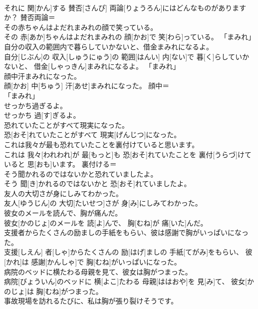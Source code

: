 \documentclass[8pt]{extreport}
\begin{document}
\begin{CJK}{UTF8}{min}
\\	それに 関[かん]する 賛否[さんぴ] 両論[りょうろん]にはどんなものがありますか？	賛否両論＝ 
\\	その赤ちゃんはよだれまみれの顔で笑っている。	
\\	その 赤[あか]ちゃんはよだれまみれの 顔[かお]で 笑[わら]っている。	「まみれ」
\\	自分の収入の範囲内で暮らしていかないと、借金まみれになるよ。	
\\	自分[じぶん]の 収入[しゅうにゅう]の 範囲[はんい] 内[ない]で 暮[く]らしていかないと、 借金[しゃっきん]まみれになるよ。	「まみれ」
\\	顔中汗まみれになった。	
\\	顔[かお] 中[ちゅう] 汗[あせ]まみれになった。	顔中＝ 
\\	「まみれ」
\\	せっかち過ぎるよ。	
\\	せっかち 過[す]ぎるよ。	
\\	恐れていたことがすべて現実になった。	
\\	恐[おそ]れていたことがすべて 現実[げんじつ]になった。	
\\	これは我々が最も恐れていたことを裏付けていると思います。	
\\	これは 我々[われわれ]が 最[もっと]も 恐[おそ]れていたことを 裏付[うらづ]けていると 思[おも]います。	裏付ける＝ 
\\	そう聞かれるのではないかと恐れていましたよ。	
\\	そう 聞[き]かれるのではないかと 恐[おそ]れていましたよ。	
\\	友人の大切さが身にしみてわかった。	
\\	友人[ゆうじん]の 大切[たいせつ]さが 身[み]にしみてわかった。	
\\	彼女のメールを読んで、胸が痛んだ。	
\\	彼女[かのじょ]のメールを 読[よ]んで、 胸[むね]が 痛[いた]んだ。	
\\	支援者からたくさんの励ましの手紙をもらい、彼は感謝で胸がいっぱいになった。	
\\	支援[しえん] 者[しゃ]からたくさんの 励[はげ]ましの 手紙[てがみ]をもらい、 彼[かれ]は 感謝[かんしゃ]で 胸[むね]がいっぱいになった。	
\\	病院のベッドに横たわる母親を見て、彼女は胸がつまった。	
\\	病院[びょういん]のベッドに 横[よこ]たわる 母親[ははおや]を 見[み]て、 彼女[かのじょ]は 胸[むね]がつまった。	
\\	事故現場を訪れるたびに、私は胸が張り裂けそうです。	

\end{CJK}
\end{document}

